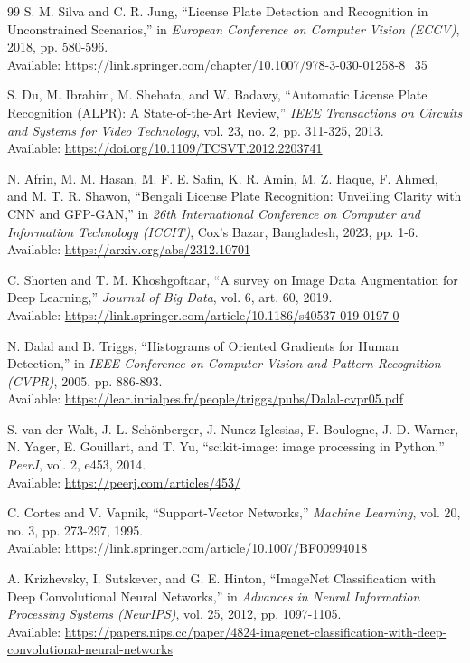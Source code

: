 \documentclass[conference]{IEEEtran}
\begin{document}
\begin{thebibliography}{99}
S. M. Silva and C. R. Jung,
``License Plate Detection and Recognition in Unconstrained Scenarios,''
in \textit{European Conference on Computer Vision (ECCV)}, 2018, pp. 580-596.\\
Available: \url{https://link.springer.com/chapter/10.1007/978-3-030-01258-8_35}

S. Du, M. Ibrahim, M. Shehata, and W. Badawy,
``Automatic License Plate Recognition (ALPR): A State-of-the-Art Review,''
\textit{IEEE Transactions on Circuits and Systems for Video Technology}, vol. 23, no. 2, pp. 311-325, 2013.\\
Available: \url{https://doi.org/10.1109/TCSVT.2012.2203741}

N. Afrin, M. M. Hasan, M. F. E. Safin, K. R. Amin, M. Z. Haque, F. Ahmed, and M. T. R. Shawon,
``Bengali License Plate Recognition: Unveiling Clarity with CNN and GFP-GAN,''
in \textit{26th International Conference on Computer and Information Technology (ICCIT)}, Cox's Bazar, Bangladesh, 2023, pp. 1-6.\\
Available: \url{https://arxiv.org/abs/2312.10701}

C. Shorten and T. M. Khoshgoftaar,
``A survey on Image Data Augmentation for Deep Learning,''
\textit{Journal of Big Data}, vol. 6, art. 60, 2019.\\
Available: \url{https://link.springer.com/article/10.1186/s40537-019-0197-0}

N. Dalal and B. Triggs,
``Histograms of Oriented Gradients for Human Detection,''
in \textit{IEEE Conference on Computer Vision and Pattern Recognition (CVPR)}, 2005, pp. 886-893.\\
Available: \url{https://lear.inrialpes.fr/people/triggs/pubs/Dalal-cvpr05.pdf}

S. van der Walt, J. L. Sch\"onberger, J. Nunez-Iglesias, F. Boulogne, J. D. Warner, N. Yager, E. Gouillart, and T. Yu,
``scikit-image: image processing in Python,''
\textit{PeerJ}, vol. 2, e453, 2014.\\
Available: \url{https://peerj.com/articles/453/}

C. Cortes and V. Vapnik,
``Support-Vector Networks,''
\textit{Machine Learning}, vol. 20, no. 3, pp. 273-297, 1995.\\
Available: \url{https://link.springer.com/article/10.1007/BF00994018}

A. Krizhevsky, I. Sutskever, and G. E. Hinton,
``ImageNet Classification with Deep Convolutional Neural Networks,''
in \textit{Advances in Neural Information Processing Systems (NeurIPS)}, vol. 25, 2012, pp. 1097-1105.\\
Available: \url{https://papers.nips.cc/paper/4824-imagenet-classification-with-deep-convolutional-neural-networks}


\end{thebibliography}
\end{document}
